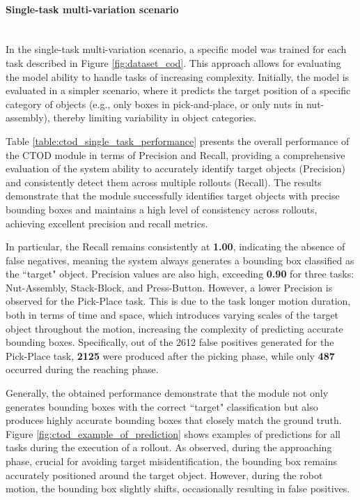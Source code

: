 \paragraph*{Single-task multi-variation scenario}\mbox{}\\
In the single-task multi-variation scenario, a specific model was trained for each task described in Figure \ref{fig:dataset_cod}. This approach allows for evaluating the model ability to handle tasks of increasing complexity. Initially, the model is evaluated in a simpler scenario, where it predicts the target position of a specific category of objects (e.g., only boxes in pick-and-place, or only nuts in nut-assembly), thereby limiting variability in object categories.

Table \ref{table:ctod_single_task_performance} presents the overall performance of the CTOD module in terms of Precision and Recall, providing a comprehensive evaluation of the system ability to accurately identify target objects (Precision) and consistently detect them across multiple rollouts (Recall). The results demonstrate that the module successfully identifies target objects with precise bounding boxes and maintains a high level of consistency across rollouts, achieving excellent precision and recall metrics. 

In particular, the Recall remains consistently at \textbf{1.00}, indicating the absence of false negatives, meaning the system always generates a bounding box classified as the ``target" object. Precision values are also high, exceeding \textbf{0.90} for three tasks: Nut-Assembly, Stack-Block, and Press-Button. However, a lower Precision is observed for the Pick-Place task. This is due to the task longer motion duration, both in terms of time and space, which introduces varying scales of the target object throughout the motion, increasing the complexity of predicting accurate bounding boxes. Specifically, out of the 2612 false positives generated for the Pick-Place task, \textbf{2125} were produced after the picking phase, while only \textbf{487} occurred during the reaching phase.

Generally, the obtained performance demonstrate that the module not only generates bounding boxes with the correct ``target" classification but also produces highly accurate bounding boxes that closely match the ground truth. Figure \ref{fig:ctod_example_of_prediction} shows examples of predictions for all tasks during the execution of a rollout. As observed, during the approaching phase, crucial for avoiding target misidentification, the bounding box remains accurately positioned around the target object. However, during the robot motion, the bounding box slightly shifts, occasionally resulting in false positives.

